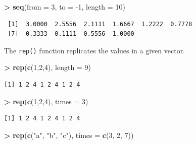 \documentclass[
]{krantz}
\makeatletter
\newenvironment{Shaded}{\begin{snugshade}}{\end{snugshade}}
\newcommand{\DataTypeTok}[1]{\textcolor[rgb]{0.27,0.27,0.27}{#1}}
\newcommand{\DecValTok}[1]{\textcolor[rgb]{0.06,0.06,0.06}{#1}}
\newcommand{\KeywordTok}[1]{\textcolor[rgb]{0.27,0.27,0.27}{\textbf{#1}}}
\newcommand{\NormalTok}[1]{#1}
\newcommand{\OperatorTok}[1]{\textcolor[rgb]{0.43,0.43,0.43}{\textbf{#1}}}
\newcommand{\StringTok}[1]{\textcolor[rgb]{0.5,0.5,0.5}{#1}}
\newenvironment{kframe}{%
\medskip{}
\setlength{\fboxsep}{.8em}
 \def\at@end@of@kframe{}%
 \ifinner\ifhmode%
  \def\at@end@of@kframe{\end{minipage}}%
  \begin{minipage}{\columnwidth}%
 \fi\fi%
 \def\FrameCommand##1{\hskip\@totalleftmargin \hskip-\fboxsep
 \colorbox{shadecolor}{##1}\hskip-\fboxsep
     \hskip-\linewidth \hskip-\@totalleftmargin \hskip\columnwidth}%
 \MakeFramed {\advance\hsize-\width
   \@totalleftmargin\z@ \linewidth\hsize
   \@setminipage}}%
 {\par\unskip\endMakeFramed%
 \at@end@of@kframe}
\renewenvironment{Shaded}{\begin{kframe}}{\end{kframe}}
\makeatother
\begin{document}
\begin{Shaded}
\begin{Highlighting}[]
\OperatorTok{\textgreater{}}\StringTok{ }\KeywordTok{seq}\NormalTok{(}\DataTypeTok{from =} \DecValTok{3}\NormalTok{, }\DataTypeTok{to =} \DecValTok{{-}1}\NormalTok{, }\DataTypeTok{length =} \DecValTok{10}\NormalTok{)}
\end{Highlighting}
\end{Shaded}

\begin{verbatim}
 [1]  3.0000  2.5556  2.1111  1.6667  1.2222  0.7778
 [7]  0.3333 -0.1111 -0.5556 -1.0000
\end{verbatim}

The \texttt{rep()} function replicates the values in a given vector.

\begin{Shaded}
\begin{Highlighting}[]
\OperatorTok{\textgreater{}}\StringTok{ }\KeywordTok{rep}\NormalTok{(}\KeywordTok{c}\NormalTok{(}\DecValTok{1}\NormalTok{,}\DecValTok{2}\NormalTok{,}\DecValTok{4}\NormalTok{), }\DataTypeTok{length =} \DecValTok{9}\NormalTok{)}
\end{Highlighting}
\end{Shaded}

\begin{verbatim}
[1] 1 2 4 1 2 4 1 2 4
\end{verbatim}

\begin{Shaded}
\begin{Highlighting}[]
\OperatorTok{\textgreater{}}\StringTok{ }\KeywordTok{rep}\NormalTok{(}\KeywordTok{c}\NormalTok{(}\DecValTok{1}\NormalTok{,}\DecValTok{2}\NormalTok{,}\DecValTok{4}\NormalTok{), }\DataTypeTok{times =} \DecValTok{3}\NormalTok{)}
\end{Highlighting}
\end{Shaded}

\begin{verbatim}
[1] 1 2 4 1 2 4 1 2 4
\end{verbatim}

\begin{Shaded}
\begin{Highlighting}[]
\OperatorTok{\textgreater{}}\StringTok{ }\KeywordTok{rep}\NormalTok{(}\KeywordTok{c}\NormalTok{(}\StringTok{"a"}\NormalTok{, }\StringTok{"b"}\NormalTok{, }\StringTok{"c"}\NormalTok{), }\DataTypeTok{times =} \KeywordTok{c}\NormalTok{(}\DecValTok{3}\NormalTok{, }\DecValTok{2}\NormalTok{, }\DecValTok{7}\NormalTok{))}
\end{Highlighting}
\end{Shaded}
\end{document}
